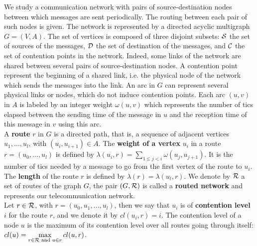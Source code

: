 \documentclass[english]{article}
\begin{document}
  We study a communication network with pairs of source-destination nodes between which messages are sent periodically. The routing between each  pair of such nodes is given. The network is represented by a directed acyclic multigraph $G=(V,A)$. The set of vertices is composed of three disjoint subsets:  ${\cal S}$ the set of sources of the messages, ${\cal D}$ the set of destination of the messages, and ${\cal C}$ the set of contention points in the network. Indeed, some links of the network are shared between several pairs of source-destination nodes. A contention point represent the beginning of a shared link, i.e. the physical node of the network which sends the messages into the link. An arc in $G$ can represent several physical links or nodes, which do not induce contention points. Each arc  $(u,v)$ in $A$ is labeled by an integer weight $\omega(u,v)$ which represents the number of tics elapsed between the sending time of the message in $u$ and the reception time of this message in $v$ using this arc. \\
  A {\bf route} $r$ in $G$ is a directed path, that is, a sequence of adjacent vertices $u_1, \ldots , u_{l}$, with $(u_i,u_{i+1}) \in A$.  The {\bf weight of a vertex} $u_i$ in a route $r=(u_0,\dots,u_l)$ is defined by $\lambda(u_i,r)= \sum\limits_{1 \leq j <i} \omega(u_j, u_{j+1})$. It is the number of tics needed by a message to go from the first vertex of the route to $u_i$. The \textbf{length} of the route $r$ is defined by $\lambda (r)= \lambda (u_l,r)$.
	We denote by ${\cal R}$ a set of routes of the graph $G$, the pair $(G,{\cal R})$ is called a \textbf{routed network} and represents our telecommunication network.\\
	Let $r \in {\cal R}$, with $r = (u_0,u_1,\dots,u_l)$, then we say that $u_i$ is of \textbf{contention level} $i$ for the route $r$, and we denote it by $cl(u_i,r) = i$. The contention level of a node $u$ is the maximum of its contention level over all routes going through itself: 
	$cl(u) = \max\limits_{r\in{\cal R} \text{ and } u \in r} cl(u,r)$.
\end{document}
